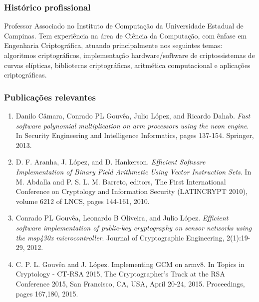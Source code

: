\documentclass[12pt]{article}
\begin{document}
\subsubsection*{Histórico profissional}

Professor Associado no Instituto de Computação da Universidade Estadual de Campinas. Tem experiência na área de Ciência da Computação, com ênfase em Engenharia Criptográfica, atuando principalmente nos seguintes temas: algoritmos criptográficos, implementação hardware/software de criptossistemas de curvas elípticas, bibliotecas criptográficas, aritmética computacional e aplicações criptográficas.

\subsubsection*{Publicações relevantes}
\begin{enumerate}\setlength\itemsep{1pt}
\item Danilo Câmara, Conrado PL Gouvêa, Julio López, and Ricardo Dahab. \emph{Fast software polynomial multiplication on arm processors using the neon engine}. In Security Engineering and Intelligence Informatics, pages 137-154. Springer, 2013.

\item D. F. Aranha, J. López, and D. Hankerson. \emph{Efficient Software Implementation of Binary Field Arithmetic Using Vector Instruction Sets}. In M. Abdalla and P. S. L. M. Barreto, editors, The First International Conference on Cryptology and Information Security (LATINCRYPT 2010), volume 6212 of LNCS, pages 144-161, 2010.

\item Conrado PL Gouvêa, Leonardo B Oliveira, and Julio López. \emph{Efficient software implementation of public-key cryptography on sensor networks using the msp430x microcontroller}. Journal of Cryptographic Engineering, 2(1):19-29, 2012.
\item C. P. L. Gouv\^ea and J. L\'opez. Implementing GCM on armv8. In Topics in Cryptology - CT-RSA 2015, The Cryptographer's Track at the RSA Conference 2015, San Francisco, CA, USA, April 20-24, 2015. Proceedings, pages 167,180, 2015.
\end{enumerate}
\end{document}
